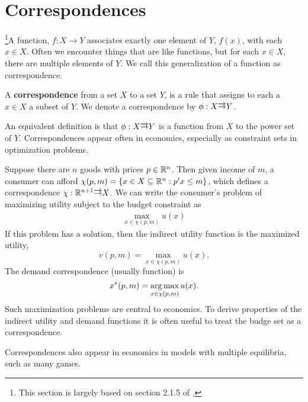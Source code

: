 \section{Correspondences \label{sec:corr}} 

\footnote{This section is largely based on section 2.1.5 of
  \cite{carter2001}.}A function, $f:X \to Y$ associates exactly one
element of $Y$, $f(x)$, with each $x \in X$. Often we encounter things
that are like functions, but for each $x \in X$, there are multiple
elements of $Y$. We call this generalization of a function as
correspondence.
\begin{definition}
  A \textbf{correspondence} from a set $X$ to a set $Y$, is a rule
  that assigns to each a $x \in X$ a subset of $Y$. We denote a
  correspondence by $\phi: X \overrightarrow{\rightarrow} Y$.
\end{definition}
An equivalent definition is that $\phi: X \overrightarrow{\rightarrow} Y$ is a function
from $X$ to the power set of $Y$. Correspondences appear often in
economics, especially as constraint sets in optimization problems.
\begin{example}
  Suppose there are $n$ goods with prices $p \in \mathbb{R}^n$. Then given
  income of $m$, a consumer can afford $\chi(p,m)=\{ x \in X \subseteq
  \mathbb{R}^n: p'x \leq m\}$, which defines a correspondence $\chi: \mathbb{R}^{n+1}
  \overrightarrow{\rightarrow} X$. We can write the consumer's problem of maximizing
  utility subject to the budget constraint as
  \begin{align*}
    \max_{x \in \chi(p,m)} u(x) 
  \end{align*}
  If this problem has a solution, then the indirect utility function
  is the maximized utility,
  \[ v(p,m) = \max_{x \in \chi(p,m)} u(x). \]
  The demand correspondence (usually function) is
  \[ x^*(p,m) = \argmax_{x \in \chi(p,m)} u(x). \] 
  Such maximization problems are central to economics. To derive
  properties of the indirect utility and demand functions it is often
  useful to treat the budge set as a correspondence.
\end{example}
Correspondences also appear in economics in models with multiple
equilibria, such as many games.

